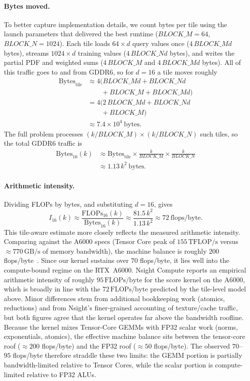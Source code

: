 \paragraph{Bytes moved.}
To better capture implementation details, we count bytes per tile using the
launch parameters that delivered the best runtime ($BLOCK\_M = 64$,
$BLOCK\_N = 1024$).  Each tile loads $64\times d$ query values once
($4\,BLOCK\_M d$ bytes), streams $1024\times d$ training values
($4\,BLOCK\_N d$ bytes), and writes the partial PDF and weighted sums
($4\,BLOCK\_M$ and $4\,BLOCK\_M d$ bytes).  All of this traffic goes to and from
GDDR6, so for $d=16$ a tile moves roughly
\[
  \begin{aligned}
    \text{Bytes}_{\text{tile}}
    &\approx
    4\bigl(BLOCK\_M d + BLOCK\_N d \\
    &\qquad + BLOCK\_M + BLOCK\_M d\bigr) \\
    &= 4\bigl(2\,BLOCK\_M d + BLOCK\_N d \\
    &\qquad + BLOCK\_M\bigr) \\
    &\approx 7.4\times 10^4\ \text{bytes}.
  \end{aligned}
\]
The full problem processes $(k / BLOCK\_M)\times(k / BLOCK\_N)$ such tiles,
so the total GDDR6 traffic is
\[
  \begin{aligned}
    \text{Bytes}_{16}(k)
    &\approx
    \text{Bytes}_{\text{tile}}
    \times
    \frac{k}{BLOCK\_M}
    \times
    \frac{k}{BLOCK\_N} \\
    &\approx
    1.13\,k^2\ \text{bytes}.
  \end{aligned}
\]

\paragraph{Arithmetic intensity.}
Dividing FLOPs by bytes, and substituting $d=16$, gives
\[
  I_{16}(k)
  \approx
  \frac{\text{FLOPs}_{16}(k)}{\text{Bytes}_{16}(k)}
  \approx
  \frac{81.5\,k^2}{1.13\,k^2}
  \approx 72\ \text{flops/byte}.
\]
This tile-aware estimate more closely reflects the measured arithmetic
intensity.  Comparing against the A6000 specs (Tensor Core peak of
$155\,\text{TFLOP/s}$ versus $\approx 770\,\text{GB/s}$ of memory bandwidth),
the machine balance is roughly $200$ flops/byte~\citep{williams2009roofline}.  Since our kernel sustains
over $70$ flops/byte, it lies well into the compute-bound regime on the
RTX~A6000.  Nsight Compute reports an empirical arithmetic intensity of roughly
$95\,\text{FLOPs/byte}$ for the score kernel on the A6000, which is broadly in
line with the $72\,\text{FLOPs/byte}$ predicted by the tile-level model above.
Minor differences stem from additional bookkeeping work (atomics, reductions)
and from Nsight's finer-grained accounting of texture/cache traffic, but both
figures agree that the kernel operates far above the bandwidth roofline.
Because the kernel mixes Tensor-Core GEMMs with FP32 scalar work (norms,
exponentials, atomics), the effective machine balance sits between the
tensor-core roof ($\approx 200$ flops/byte) and the FP32 roof ($\approx 50$
flops/byte).  The observed $70$--$95$ flops/byte therefore straddle these two
limits: the GEMM portion is partially bandwidth-limited relative to Tensor
Cores, while the scalar portion is compute-limited relative to FP32 ALUs.
